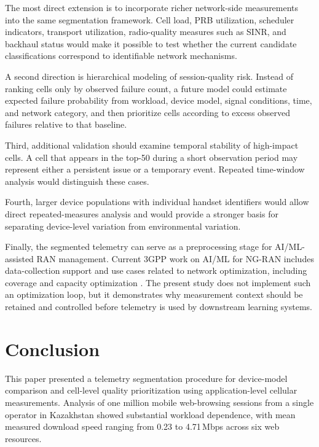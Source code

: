 \documentclass[conference]{IEEEtran}
\begin{document}
The most direct extension is to incorporate richer network-side measurements into the same segmentation framework. Cell load, PRB utilization, scheduler indicators, transport utilization, radio-quality measures such as SINR, and backhaul status would make it possible to test whether the current candidate classifications correspond to identifiable network mechanisms.

A second direction is hierarchical modeling of session-quality risk. Instead of ranking cells only by observed failure count, a future model could estimate expected failure probability from workload, device model, signal conditions, time, and network category, and then prioritize cells according to excess observed failures relative to that baseline.

Third, additional validation should examine temporal stability of high-impact cells. A cell that appears in the top-50 during a short observation period may represent either a persistent issue or a temporary event. Repeated time-window analysis would distinguish these cases.

Fourth, larger device populations with individual handset identifiers would allow direct repeated-measures analysis and would provide a stronger basis for separating device-level variation from environmental variation.

Finally, the segmented telemetry can serve as a preprocessing stage for AI/ML-assisted RAN management. Current 3GPP work on AI/ML for NG-RAN includes data-collection support and use cases related to network optimization, including coverage and capacity optimization \cite{b6,b7}. The present study does not implement such an optimization loop, but it demonstrates why measurement context should be retained and controlled before telemetry is used by downstream learning systems.

\section{Conclusion}

This paper presented a telemetry segmentation procedure for device-model comparison and cell-level quality prioritization using application-level cellular measurements. Analysis of one million mobile web-browsing sessions from a single operator in Kazakhstan showed substantial workload dependence, with mean measured download speed ranging from 0.23 to 4.71\,Mbps across six web resources.
\end{document}
